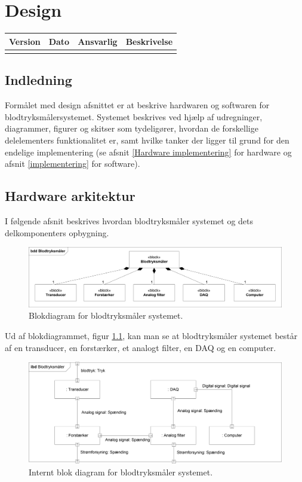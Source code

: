 \chapter{Design}

\begin{longtabu} to 
    Version &    Dato &    Ansvarlig &    Beskrivelse\\[-1ex]
    \midrule
    
\label{version_Systemark}
\end{longtabu}

\section{Indledning}
Formålet med design afsnittet er at beskrive hardwaren og softwaren for blodtryksmålersystemet. Systemet beskrives ved hjælp af udregninger, diagrammer, figurer og skitser som tydeligører, hvordan de forskellige delelementers funktionalitet er, samt hvilke tanker der ligger til grund for den endelige implementering (se afsnit \ref{Hardware implementering} for hardware og afsnit \ref{implementering} for software).

\section{Hardware arkitektur}
I følgende afsnit beskrives hvordan blodtryksmåler systemet og dets delkomponenters opbygning.
\\
\begin{figure}[H]
	\centering
	\includegraphics[width=1\textwidth]{Figurer/Hardware/BDD1}
	\caption{Blokdiagram for blodtryksmåler systemet.}
	\label{BDD blodtryksmaaler}
\end{figure}

Ud af blokdiagrammet, figur \ref{BDD blodtryksmaaler}, kan man se at blodtryksmåler systemet består af en transducer, en forstærker, et analogt filter, en DAQ og en computer.\\
\begin{figure}[H]
	\centering
	\includegraphics[width=1\textwidth]{Figurer/Hardware/IBD}
	\caption{Internt blok diagram for blodtryksmåler systemet.}
	\label{IBD blodtryksmaaler}
\end{figure}

